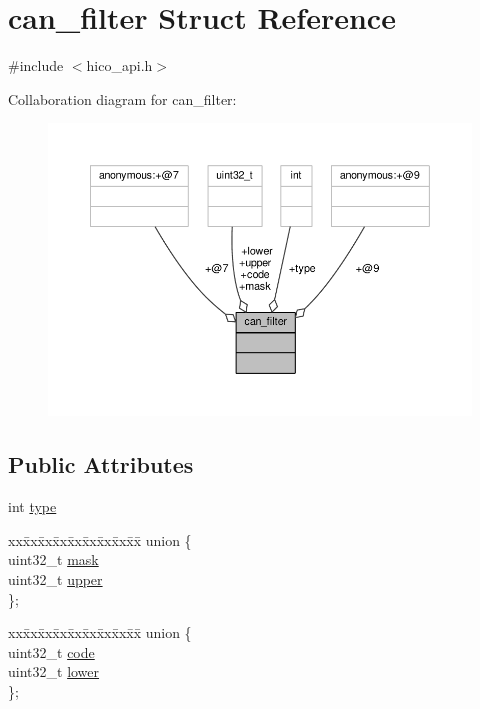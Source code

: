 \hypertarget{structcan__filter}{}\section{can\+\_\+filter Struct Reference}
\label{structcan__filter}


{\ttfamily \#include $<$hico\+\_\+api.\+h$>$}



Collaboration diagram for can\+\_\+filter\+:\nopagebreak
\begin{figure}[H]
\begin{center}
\leavevmode
\includegraphics[width=350pt]{structcan__filter__coll__graph}
\end{center}
\end{figure}
\subsection*{Public Attributes}
\begin{DoxyCompactItemize}
\item 
int \hyperlink{structcan__filter_a796cdd0845b3b22c44028a898938d3e0}{type}
\item 
\begin{tabbing}
xx\=xx\=xx\=xx\=xx\=xx\=xx\=xx\=xx\=\kill
union \{\\
\>uint32\_t \hyperlink{structcan__filter_a15632117f3f031fbbeb28ef562f9ac94}{mask}\\
\>uint32\_t \hyperlink{structcan__filter_a75039f47394150965764154e50f2f3e1}{upper}\\
\}; \\

\end{tabbing}\item 
\begin{tabbing}
xx\=xx\=xx\=xx\=xx\=xx\=xx\=xx\=xx\=\kill
union \{\\
\>uint32\_t \hyperlink{structcan__filter_a33aa98b8a3e04907890496958dcf63da}{code}\\
\>uint32\_t \hyperlink{structcan__filter_aeb05b2987bb06a96739257032fbeaacd}{lower}\\
\}; \\

\end{tabbing}\end{DoxyCompactItemize}


